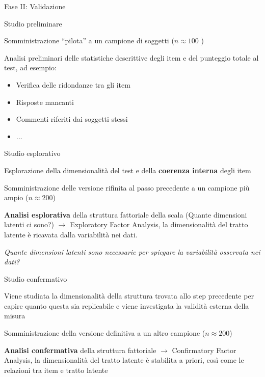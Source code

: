 \documentclass[compress]{beamer}
\begin{document}
\begin{frame}[allowframebreaks]{Fase II: Validazione}
	
	\begin{block}{Studio preliminare}
		
		Somministrazione ``pilota'' a un campione di soggetti ($n \approx 100$ )
		
		Analisi preliminari delle statistiche descrittive degli item e del punteggio totale al test, ad esempio: 
		
		\begin{itemize}
			\item Verifica delle ridondanze tra gli item 
			\item Risposte mancanti 
			\item Commenti riferiti dai soggetti stessi 
			\item  $\ldots$ 
		\end{itemize}
		
		
	\end{block}
	
	\begin{block}{Studio esplorativo}
		
		Esplorazione della dimensionalità del test e della \textbf{coerenza interna} degli item
		
		Somministrazione delle versione rifinita al passo precedente a un campione più ampio ($n \approx 200$)
		
		\textbf{Analisi esplorativa} della struttura fattoriale della scala (Quante dimensioni latenti ci sono?) $\rightarrow$ Exploratory Factor Analysis, la dimensionalità del tratto latente è ricavata dalla variabilità nei dati.  
		
		\bigskip
		\emph{Quante dimensioni latenti sono necessarie per spiegare la variabilità osservata nei dati?}
	\end{block}
	
	
	\begin{block}{Studio confermativo}
		
		
		Viene studiata la dimensionalità della struttura trovata allo step precedente per capire quanto questa sia replicabile e viene investigata la validità esterna della misura
		
		Somministrazione della versione definitiva a un altro campione ($n \approx 200$)
		
		\textbf{Analisi confermativa} della struttura fattoriale $\rightarrow$ Confirmatory Factor Analysis, la dimensionalità del tratto latente è stabilita a priori, così come le relazioni tra item e tratto latente 
		

\end{block}
\end{frame}
\end{document}
